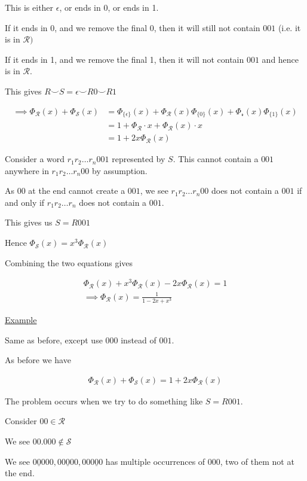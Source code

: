 \documentclass{article}
\newcommand\mc{\mathcal}
\begin{document}
This is either $\epsilon$, or ends in 0, or ends in 1.

If it ends in 0, and we remove the final 0, then it will still not contain $001$ (i.e. it is in $\mc{R})$

If it ends in 1, and we remove the final 1, then it will not contain $001$ and hence is in $\mc{R}$.

This gives $R \smile S = \epsilon \smile R0 \smile R1$

\begin{align*}
    \implies \Phi_{\mc{R}}(x) + \Phi_{\mc{S}}(x) &= \Phi_{\{\epsilon\}}(x) + \Phi_{\mc{R}}(x) \Phi_{\{0\}}(x) + \Phi_{\mc{r}}(x) \Phi_{\{1\}}(x) \\
    &= 1 + \Phi_{\mc{R}} \cdot x + \Phi_{\mc{R}}(x) \cdot x \\
    &= 1 + 2x \Phi_{\mc{R}}(x)
\end{align*}

Consider a word $r_1r_2 \ldots r_n001$ represented by $S$. This cannot contain a $001$ anywhere in $r_1r_2 \ldots r_n00$ by assumption.

As $00$ at the end cannot create a $001$, we see $r_1r_2 \ldots r_n00$ does not contain a $001$ if and only if $r_1r_2 \ldots r_n$ does not contain a $001$.

This gives us $S = R001$

Hence $\Phi_{\mc{S}}(x) = x^3\Phi_{\mc{R}}(x)$

Combining the two equations gives

\begin{align*}
    \Phi_{\mc{R}}(x) + x^3\Phi_{\mc{R}}(x) - 2x\Phi_{\mc{R}}(x) = 1 \\
    \implies \Phi_{\mc{R}}(x) = \frac{1}{1-2x+x^3}
\end{align*}

\underline{Example}

Same as before, except use $000$ instead of $001$.

As before we have

\begin{align*}
    \Phi_{\mc{R}}(x) + \Phi_{\mc{S}}(x) = 1 + 2x \Phi_{\mc{R}}(x)
\end{align*}

The problem occurs when we try to do something like $S = R001$.

Consider $00 \in \mc{R}$

We see $00.000 \notin \mc{S}$

We see $\underline{000}00, 0\underline{000}0,00\underline{000}$ has multiple occurrences of $000$, two of them not at the end.
\end{document}
